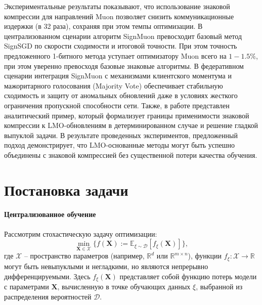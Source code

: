 \documentclass{article}
\begin{document}
Экспериментальные результаты показывают, что использование знаковой компрессии для направлений Muon позволяет снизить коммуникационные издержки (в 32 раза), сохраняя при этом темпы оптимизации. В централизованном сценарии алгоритм SignMuon превосходит базовый метод SignSGD по скорости сходимости и итоговой точности. При этом точность предложенного 1-битного метода уступает оптимизатору Muon всего на $1-1.5\%$, при этом уверенно превосходя базовые знаковые алгоритмы. В федеративном сценарии интеграция SignMuon с механизмами клиентского моментума и мажоритарного голосования (Majority Vote) обеспечивает стабильную сходимость и защиту от аномальных обновлений даже в условиях жесткого ограничения пропускной способности сети. Также, в работе представлен аналитический пример, который формализует границы применимости знаковой компрессии к LMO-обновлениям в детерминированном случае и решение гладкой выпуклой задачи. В результате проведенных экспериментов, предложенный подход демонстрирует, что LMO-основанные методы могут быть успешно объединены с знаковой компрессией без существенной потери качества обучения.



\section{Постановка задачи}\label{sec:proState}

\paragraph{Централизованное обучение} Рассмотрим стохастическую задачу оптимизации:
\begin{equation}
\min_{\mathbf{X} \in \mathcal{X}} \{f(\mathbf{X}) := \mathbb{E}_{\xi \sim \mathcal{D}} [f_{\xi}(\mathbf{X})]\},
\end{equation}
где $\mathcal{X}$ -- пространство параметров (например, $\mathbb{R}^d$ или $\mathbb{R}^{m \times n}$),  функции $f_{\xi} : \mathcal{X} \to \mathbb{R}$ могут быть невыпуклыми и негладкими, но являются непрерывно дифференцируемыми. Здесь $f_{\xi}(\mathbf{X})$ представляет собой функцию потерь модели с параметрами $\mathbf{X}$, вычисленную в точке обучающих данных $\xi$, выбранной из распределения вероятностей $\mathcal{D}$.
\end{document}
